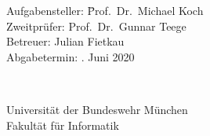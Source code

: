 \begin{center}
	
	\content
	
	\vspace{2cm}
	
	\parbox{1cm}{
\begin{large}
\begin{tabbing}
Aufgabensteller: \hspace{.5cm} \=Prof.\ Dr.\ Michael Koch\\[2mm]
Zweitprüfer: \>Prof.\ Dr.\ Gunnar Teege\\[2mm]
Betreuer:
\>Julian Fietkau\\[5mm]
Abgabetermin: . Juni 2020\\
\end{tabbing}
\end{large}}\\
\vspace{5mm}

\vfill

{\Large %
Universität der Bundeswehr München\\
Fakultät für Informatik\\
}

\end{center}
